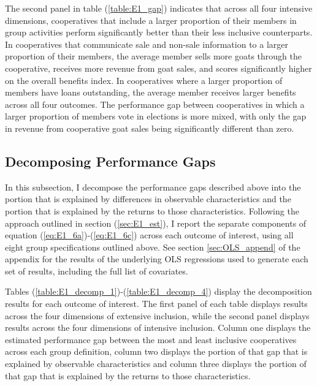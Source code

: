 \documentclass[11pt]{article}
\begin{document}
The second panel in table (\ref{table:E1_gap}) indicates that across all four intensive dimensions, cooperatives that include a larger proportion of their members in group activities perform significantly better than their less inclusive counterparts. In cooperatives that communicate sale and non-sale information to a larger proportion of their members, the average member sells more goats through the cooperative, receives more revenue from goat sales, and scores significantly higher on the overall benefits index. In cooperatives where a larger proportion of members have loans outstanding, the average member receives larger benefits across all four outcomes. The performance gap between cooperatives in which a larger proportion of members vote in elections is more mixed, with only the gap in revenue from cooperative goat sales being significantly different than zero. 


\subsection{Decomposing Performance Gaps}

In this subsection, I decompose the performance gaps described above into the portion that is explained by differences in observable characteristics and the portion that is explained by the returns to those characteristics. Following the approach outlined in section (\ref{sec:E1_est}), I report the separate components of equation (\ref{eq:E1_6a})-(\ref{eq:E1_6c}) across each outcome of interest, using all eight group specifications outlined above. See section \ref{sec:OLS_append} of the appendix for the results of the underlying OLS regressions used to generate each set of results, including the full list of covariates.

Tables (\ref{table:E1_decomp_1})-(\ref{table:E1_decomp_4}) display the decomposition results for each outcome of interest. The first panel of each table displays results across the four dimensions of extensive inclusion, while the second panel displays results across the four dimensions of intensive inclusion. Column one displays the estimated performance gap between the most and least inclusive cooperatives across each group definition, column two displays the portion of that gap that is explained by observable characteristics and column three displays the portion of that gap that is explained by the returns to those characteristics. 
\end{document}
